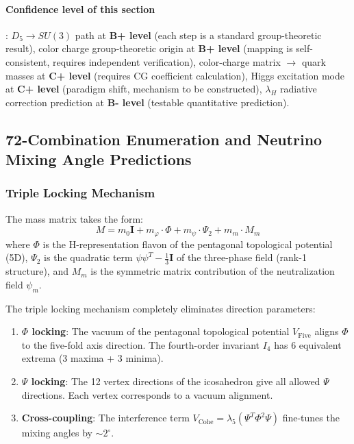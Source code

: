 \documentclass[12pt,a4paper,twocolumn]{article}
\renewcommand{\phi}{\varphi}
\begin{document}
\paragraph{Confidence level of this section}: $D_5 \to SU(3)$ path at \textbf{B+ level} (each step is a standard group-theoretic result), color charge group-theoretic origin at \textbf{B+ level} (mapping is self-consistent, requires independent verification), color-charge matrix $\to$ quark masses at \textbf{C+ level} (requires CG coefficient calculation), Higgs excitation mode at \textbf{C+ level} (paradigm shift, mechanism to be constructed), $\lambda_H$ radiative correction prediction at \textbf{B- level} (testable quantitative prediction).

\subsection{72-Combination Enumeration and Neutrino Mixing Angle Predictions}
\label{subsec:72_combos}

\subsubsection{Triple Locking Mechanism}

The mass matrix takes the form:
\begin{equation}
M = m_0 \mathbf{I} + m_\phi \cdot \Phi + m_\psi \cdot \Psi_2 + m_m \cdot M_m
\label{eq:mass_matrix_flavor_en}
\end{equation}
where $\Phi$ is the H-representation flavon of the pentagonal topological potential (5D), $\Psi_2$ is the quadratic term $\psi\psi^T - \frac{1}{3}\mathbf{I}$ of the three-phase field (rank-1 structure), and $M_m$ is the symmetric matrix contribution of the neutralization field $\psi_m$.

The triple locking mechanism completely eliminates direction parameters:

\begin{enumerate}
\item \textbf{$\Phi$ locking}: The vacuum of the pentagonal topological potential $V_{\text{Five}}$ aligns $\Phi$ to the five-fold axis direction. The fourth-order invariant $I_4$ has 6 equivalent extrema (3 maxima + 3 minima).
\item \textbf{$\Psi$ locking}: The 12 vertex directions of the icosahedron give all allowed $\Psi$ directions. Each vertex corresponds to a vacuum alignment.
\item \textbf{Cross-coupling}: The interference term $V_{\text{Cohe}} = \lambda_5 (\Psi^T \Phi^2 \Psi)$ fine-tunes the mixing angles by $\sim 2^\circ$.
\end{enumerate}
\end{document}
